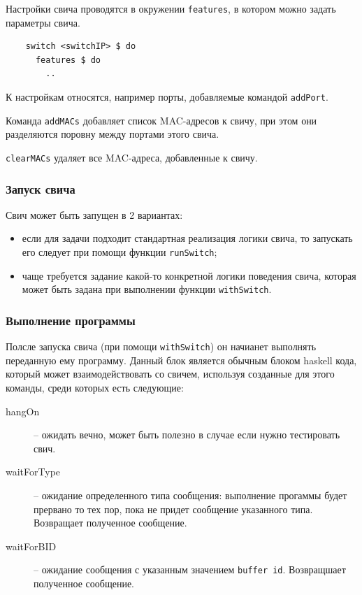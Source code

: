 \documentclass[9pt,a4paper]{article}
\begin{document}
Настройки свича проводятся в окружении \lstinline!features!, в котором можно задать
параметры свича.

\begin{lstlisting}
    switch <switchIP> $ do
      features $ do
        ..
\end{lstlisting}

К настройкам относятся, например порты, добавляемые командой \lstinline!addPort!.

Команда \lstinline!addMACs! добавляет список MAC-адресов к свичу, при этом они разделяются
поровну между портами этого свича.

\lstinline!clearMACs! удаляет все MAC-адреса, добавленные к свичу.


\subsubsection{Запуск свича}

Свич может быть запущен в 2 вариантах:

\begin{itemize}
  \item если для задачи подходит стандартная реализация логики свича, то запускать
    его следует при помощи функции \lstinline!runSwitch!;
  \item чаще требуется задание какой-то конкретной логики поведения свича, которая
    может быть задана при выполнении функции \lstinline!withSwitch!.
\end{itemize}


\subsubsection{Выполнение программы}
Полсле запуска свича (при помощи \lstinline!withSwitch!) он начианет выполнять
переданную ему программу. Данный блок является обычным блоком haskell кода,
который может взаимодействовать со свичем, используя созданные для этого команды,
среди которых есть следующие:

\begin{description}
  \item[hangOn] -- ожидать вечно, может быть полезно в случае если нужно тестировать
свич.

  \item[waitForType] -- ожидание определенного типа сообщения: выполнение прогаммы
будет прервано то тех пор, пока не придет сообщение указанного типа. Возвращает 
полученное сообщение.

  \item[waitForBID] -- ожидание сообщения с указанным значением \lstinline!buffer id!.
Возвращшает полученное сообщение.

\end{description}
\end{document}
